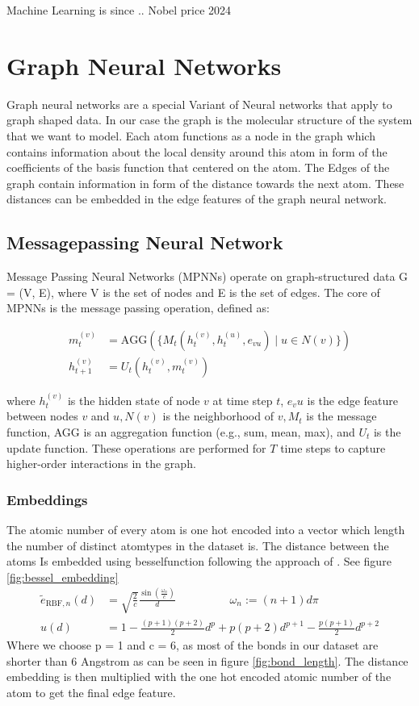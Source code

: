 Machine Learning is since .. Nobel price 2024


\section{Graph Neural Networks}
Graph neural networks are a special Variant of Neural networks that apply to graph shaped data.
In our case the graph is the molecular structure of the system that we want to model. Each atom functions as a node in the graph which contains information about the local density around this atom in form of the coefficients of the basis function that centered on the atom. The Edges of the graph contain information in form of the distance towards the next atom. These distances can be embedded in the edge features of the graph neural network.

\subsection{Messagepassing Neural Network}
Message Passing Neural Networks (MPNNs) operate on graph-structured data G = (V, E), where V is the set of nodes and E is the set of edges. The core of MPNNs is the message passing operation, defined as:

\begin{align}
m_t^{(v)} &= \text{AGG}\left(\{M_t(h_t^{(v)}, h_t^{(u)}, e_{vu}) \mid u \in N(v)\}\right) \\
h_{t+1}^{(v)} &= U_t(h_t^{(v)}, m_t^{(v)})
\end{align} 
    

where $h_t^(v)$ is the hidden state of node $v$ at time step $t$, $e_vu$ is the edge feature between nodes $v$ and $u, N(v)$ is the neighborhood of $v, M_t$ is the message function, AGG is an aggregation function (e.g., sum, mean, max), and $U_t$ is the update function. These operations are performed for $T$ time steps to capture higher-order interactions in the graph.

\subsubsection{Embeddings}
The atomic number of every atom is one hot encoded into a vector which length the number of distinct atomtypes in the dataset is. The distance between the atoms Is embedded using besselfunction following the approach of \cite{https://arxiv.org/pdf/2003.03123}. See figure \ref{fig:bessel_embedding}
\begin{align}
    \tilde{e}_{\text{RBF},n}(d) &= \sqrt{\frac{2}{c}}\frac{\sin(\frac{\omega_n }{c})}{d}\hspace{2cm} \omega_n :=(n+1)d\pi\\
    u(d)&= 1-\frac{(p+1)(p+2)}{2}d^p + p(p+2)d^{p+1}-\frac{p(p+1)}{2}d^{p+2}
\end{align}
Where we choose p = 1 and c = 6, as most of the bonds in our dataset are shorter than 6 Angstrom as can be seen in figure \ref{fig:bond_length}. The distance embedding is then multiplied with the one hot encoded atomic number of the atom to get the final edge feature.

